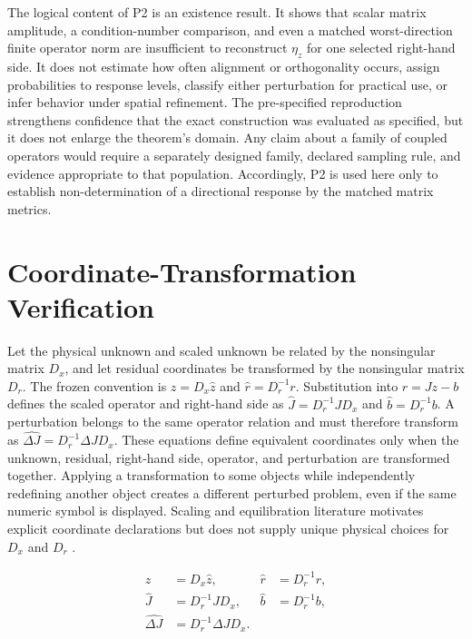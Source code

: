 \documentclass[preprint,12pt]{elsarticle}
\begin{document}
The logical content of P2 is an existence result. It shows that scalar matrix amplitude, a condition-number comparison, and even a matched worst-direction finite operator norm are insufficient to reconstruct $\eta_z$ for one selected right-hand side. It does not estimate how often alignment or orthogonality occurs, assign probabilities to response levels, classify either perturbation for practical use, or infer behavior under spatial refinement. The pre-specified reproduction strengthens confidence that the exact construction was evaluated as specified, but it does not enlarge the theorem's domain. Any claim about a family of coupled operators would require a separately designed family, declared sampling rule, and evidence appropriate to that population. Accordingly, P2 is used here only to establish non-determination of a directional response by the matched matrix metrics.

\FloatBarrier
\section{Coordinate-Transformation Verification}
\label{sec:coordinate}

Let the physical unknown and scaled unknown be related by the nonsingular matrix $D_x$, and let residual coordinates be transformed by the nonsingular matrix $D_r$. The frozen convention is $z = D_x \widehat z$ and $\widehat r = D_r^{-1} r$. Substitution into $r = Jz-b$ defines the scaled operator and right-hand side as $\widehat J = D_r^{-1} J D_x$ and $\widehat b = D_r^{-1}b$. A perturbation belongs to the same operator relation and must therefore transform as $\widehat{\Delta J} = D_r^{-1} \Delta J D_x$. These equations define equivalent coordinates only when the unknown, residual, right-hand side, operator, and perturbation are transformed together. Applying a transformation to some objects while independently redefining another object creates a different perturbed problem, even if the same numeric symbol is displayed. Scaling and equilibration literature motivates explicit coordinate declarations but does not supply unique physical choices for $D_x$ and $D_r$ \cite{S05,S06,S07,S08}.

\begin{linenomath*}
\begin{equation}
\begin{aligned}
z&=D_x\widehat z, & \widehat r&=D_r^{-1}r,\\
\widehat J&=D_r^{-1}JD_x, & \widehat b&=D_r^{-1}b,\\
\widehat{\Delta J}&=D_r^{-1}\Delta J D_x.
\end{aligned}
\label{eq:coordinate_transform}
\end{equation}
\end{linenomath*}
\end{document}
